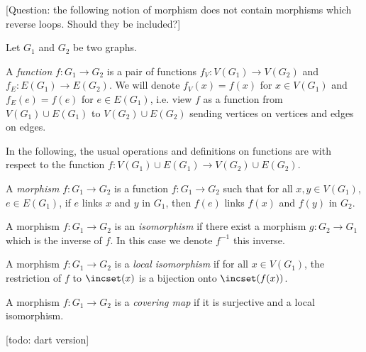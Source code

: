 [Question: the following notion of morphism does not contain morphisms which
reverse loops. Should they be included?]

Let $G_1$ and $G_2$ be two graphs.


\begin{definition}
  \label{def:function_graphs}
  A \emph{function} $f : G_1 \rightarrow G_2$ is a pair of functions $f_V : V(G_1) \rightarrow V(G_2)$
  and $f_E : E(G_1) \rightarrow E(G_2)$.
  We will denote $f_V(x)=f(x)$ for $x \in V(G_1)$ and $f_E(e)=f(e)$ for $e \in E(G_1)$,
  i.e. view $f$ as a function from $V(G_1) \cup E(G_1)$ to $V(G_2) \cup E(G_2)$
  sending vertices on vertices and edges on edges.
\end{definition}

In the following, the usual operations and definitions on functions are
with respect to the function $f : V(G_1) \cup E(G_1) \rightarrow V(G_2) \cup E(G_2)$.

\begin{definition}
  \label{def:graph_morphism}
  A \emph{morphism} $f : G_1 \rightarrow G_2$ is
  a function $f : G_1 \rightarrow G_2$ such that for all
  $x, y \in V(G_1)$, $e \in E(G_1)$,
  if $e$ links $x$ and $y$ in $G_1$, then $f(e)$ links $f(x)$ and $f(y)$ in $G_2$.
\end{definition}

\begin{definition}
  \label{def:graph_isomorphism}
  A morphism $f : G_1 \rightarrow G_2$ is an \emph{isomorphism} if
  there exist a morphism $g : G_2 \rightarrow G_1$ which is the inverse of $f$.
  In this case we denote $f^{-1}$ this inverse.
\end{definition}

\begin{definition}
  \label{def:local_isomorphism}
  A morphism $f : G_1 \rightarrow G_2$ is a \emph{local isomorphism}
  if for all $x \in V(G_1)$, the restriction of $f$ to $\incset(x)$ is
  a bijection onto $\incset(f(x))$.
\end{definition}

\begin{definition}
  \label{def:covering_map}
  A morphism $f : G_1 \rightarrow G_2$ is a \emph{covering map} if it is
  surjective and a local isomorphism.
\end{definition}

[todo: dart version]

